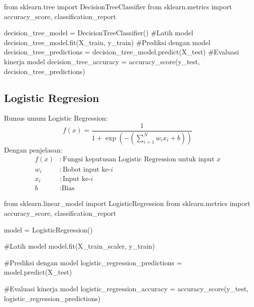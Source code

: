 \documentclass[
  letterpaper,
]{krantz}
\makeatletter
\newenvironment{Shaded}{\begin{snugshade}}{\end{snugshade}}
\newcommand{\CommentTok}[1]{\textcolor[rgb]{0.37,0.37,0.37}{#1}}
\newcommand{\ImportTok}[1]{\textcolor[rgb]{0.00,0.46,0.62}{#1}}
\newcommand{\NormalTok}[1]{\textcolor[rgb]{0.00,0.23,0.31}{#1}}
\newcommand{\OperatorTok}[1]{\textcolor[rgb]{0.37,0.37,0.37}{#1}}
\newenvironment{kframe}{%
\medskip{}
\setlength{\fboxsep}{.8em}
 \def\at@end@of@kframe{}%
 \ifinner\ifhmode%
  \def\at@end@of@kframe{\end{minipage}}%
  \begin{minipage}{\columnwidth}%
 \fi\fi%
 \def\FrameCommand##1{\hskip\@totalleftmargin \hskip-\fboxsep
 \colorbox{shadecolor}{##1}\hskip-\fboxsep
     \hskip-\linewidth \hskip-\@totalleftmargin \hskip\columnwidth}%
 \MakeFramed {\advance\hsize-\width
   \@totalleftmargin\z@ \linewidth\hsize
   \@setminipage}}%
 {\par\unskip\endMakeFramed%
 \at@end@of@kframe}
\renewenvironment{Shaded}{\begin{kframe}}{\end{kframe}}
\makeatother
\begin{document}
\begin{Shaded}
\begin{Highlighting}[]
\ImportTok{from}\NormalTok{ sklearn.tree }\ImportTok{import}\NormalTok{ DecisionTreeClassifier}
\ImportTok{from}\NormalTok{ sklearn.metrics }\ImportTok{import}\NormalTok{ accuracy\_score, classification\_report}

\NormalTok{decision\_tree\_model }\OperatorTok{=}\NormalTok{ DecisionTreeClassifier()}
\CommentTok{\#Latih model}
\NormalTok{decision\_tree\_model.fit(X\_train, y\_train)}
\CommentTok{\#Prediksi dengan model}
\NormalTok{decision\_tree\_predictions }\OperatorTok{=}\NormalTok{ decision\_tree\_model.predict(X\_test)}
\CommentTok{\#Evaluasi kinerja model}
\NormalTok{decision\_tree\_accuracy }\OperatorTok{=}\NormalTok{ accuracy\_score(y\_test, decision\_tree\_predictions)}
\end{Highlighting}
\end{Shaded}

\hypertarget{logistic-regresion}{%
\subsection{Logistic Regresion}\label{logistic-regresion}}

Rumus umum Logistic Regression: \[
f(x) = \frac{1}{1 + \exp(-\left(\sum_{i=1}^{N} w_i x_i + b\right))}
\] Dengan penjelasan: \[
\begin{align*}
f(x) & : \text{Fungsi keputusan Logistic Regression untuk input } x \\
w_i & : \text{Bobot input ke-} i \\
x_i & : \text{Input ke-} i \\
b & : \text{Bias}
\end{align*}
\]

\begin{Shaded}
\begin{Highlighting}[]
\ImportTok{from}\NormalTok{ sklearn.linear\_model }\ImportTok{import}\NormalTok{ LogisticRegression}
\ImportTok{from}\NormalTok{ sklearn.metrics }\ImportTok{import}\NormalTok{ accuracy\_score, classification\_report}

\NormalTok{model }\OperatorTok{=}\NormalTok{ LogisticRegression()}

\CommentTok{\#Latih model}
\NormalTok{model.fit(X\_train\_scaler, y\_train)}

\CommentTok{\#Prediksi dengan model}
\NormalTok{logistic\_regression\_predictions }\OperatorTok{=}\NormalTok{ model.predict(X\_test)}

\CommentTok{\#Evaluasi kinerja model}
\NormalTok{logistic\_regression\_accuracy }\OperatorTok{=}\NormalTok{ accuracy\_score(y\_test, logistic\_regression\_predictions)}
\end{Highlighting}
\end{Shaded}
\end{document}
